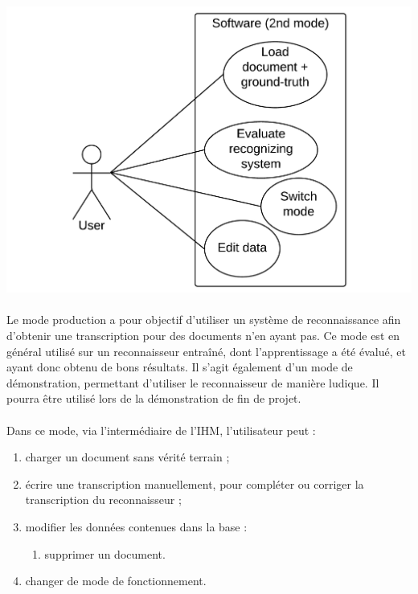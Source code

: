 \newpage

\begin{mdframed}[frametitle={Figure 3 : Diagramme de cas d'utilisation (mode évaluation)}, innerbottommargin=10]
\begin{center}
\includegraphics[scale=0.4]{Usecase_2.pdf}
\end{center}
\end{mdframed}

\paragraph{}
Le mode production a pour objectif d’utiliser un système de reconnaissance afin
d’obtenir une transcription pour des documents n’en ayant pas. Ce mode est en
général utilisé sur un reconnaisseur entraîné, dont l’apprentissage a été
évalué, et ayant donc obtenu de bons résultats. Il s’agit également d’un mode
de démonstration, permettant d’utiliser le reconnaisseur de manière ludique.
Il pourra être utilisé lors de la démonstration de fin de projet.

\paragraph{}
Dans ce mode, via l'intermédiaire de l’IHM, l’utilisateur peut :
\begin{enumerate}
\item charger un document sans vérité terrain ;
\item écrire une transcription manuellement, pour compléter ou corriger la
transcription du reconnaisseur ;
\item modifier les données contenues dans la base :
\begin{enumerate}
\item supprimer un document.
\end{enumerate}
\item changer de mode de fonctionnement.
\end{enumerate}

